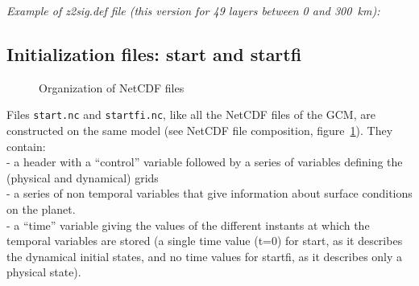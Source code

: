 \noindent
{\it Example of  z2sig.def file
(this version for 49 layers between  0 and 300~km):}
{\footnotesize

}

\subsection{Initialization files: start and startfi}

%
\begin{figure}[h]
\centering
{}
\caption{Organization of NetCDF files \label{fg:netcdf}}
\end{figure}
%
Files {\tt start.nc} and {\tt startfi.nc}, like all the NetCDF files of
the GCM,
are constructed on the same model (see NetCDF file composition,
figure~\ref{fg:netcdf}). They contain:\\
- a header with a ``control'' variable followed by a series of variables
defining the (physical and dynamical) grids \\
- a series of non temporal variables that give information about surface 
conditions on the planet.\\
- a ``time'' variable giving the values of the different instants at which 
the temporal variables are stored 
(a single time value (t=0) for start,
as it describes the dynamical initial states,
and no time values for startfi, as it describes only a physical state).\\

